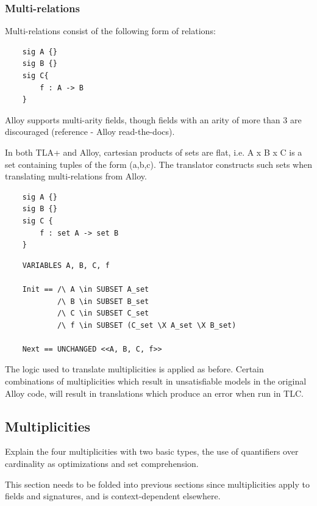 \subsubsection{Multi-relations}

Multi-relations consist of the following form of relations:

\begin{verbatim}
	sig A {}
	sig B {}
	sig C{
		f : A -> B
	}
\end{verbatim}

Alloy supports multi-arity fields, though fields with an arity of more than 3 are discouraged (reference - Alloy read-the-docs). 

In both TLA+ and Alloy, cartesian products of sets are flat, i.e. A x B x C is a set containing tuples of the form (a,b,c). The translator constructs such sets when translating multi-relations from Alloy.

\begin{verbatim}
	sig A {}
	sig B {}
	sig C {
		f : set A -> set B
	}
\end{verbatim}

\begin{verbatim}
	VARIABLES A, B, C, f

	Init == /\ A \in SUBSET A_set
			/\ B \in SUBSET B_set
			/\ C \in SUBSET C_set
			/\ f \in SUBSET (C_set \X A_set \X B_set)

	Next == UNCHANGED <<A, B, C, f>>
\end{verbatim}

The logic used to translate multiplicities is applied as before. Certain combinations of multiplicities which result in unsatisfiable models in the original Alloy code, will result in translations which produce an error when run in TLC.


\subsection{Multiplicities}

Explain the four multiplicities with two basic types, the use of quantifiers over cardinality as optimizations and set comprehension.

This section needs to be folded into previous sections since multiplicities apply to fields and signatures, and is context-dependent elsewhere.

